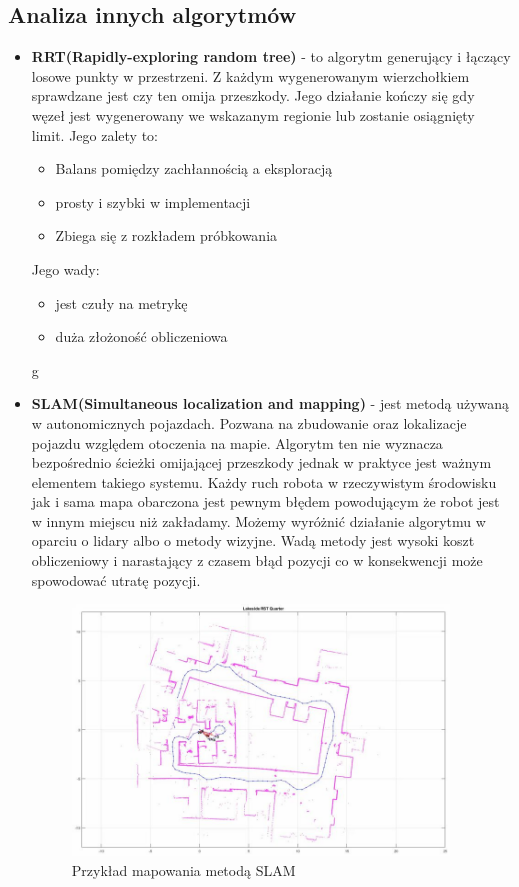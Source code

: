 \subsection{Analiza innych algorytmów}
\begin{itemize}
	\item{ \textbf{RRT(Rapidly-exploring random tree)}\cite{RRTLec} - to algorytm generujący i łączący 
	losowe punkty w przestrzeni. Z każdym wygenerowanym wierzchołkiem sprawdzane jest czy ten omija przeszkody.
	Jego działanie kończy się gdy węzeł jest wygenerowany we wskazanym regionie lub zostanie osiągnięty limit.
	Jego zalety to:
		\begin{itemize}
			\item Balans pomiędzy zachłannością a eksploracją
			\item prosty i szybki w implementacji
			\item Zbiega się z rozkładem próbkowania
		\end{itemize}
	Jego wady:
		\begin{itemize}
			\item jest czuły na metrykę
			\item duża złożoność obliczeniowa
		\end{itemize}
	}g
	\item{\textbf{SLAM(Simultaneous localization and mapping)} \cite{SLAMMat} - jest metodą używaną w autonomicznych 
	pojazdach. Pozwana na zbudowanie oraz lokalizacje pojazdu względem otoczenia na mapie. Algorytm ten nie wyznacza bezpośrednio
	ścieżki omijającej przeszkody jednak w praktyce jest ważnym elementem takiego systemu. Każdy ruch robota w rzeczywistym 
	środowisku jak i sama mapa obarczona jest pewnym błędem powodującym że robot jest w innym miejscu niż zakładamy. 
	Możemy wyróżnić działanie algorytmu w oparciu o lidary albo o metody wizyjne. Wadą metody jest wysoki koszt obliczeniowy 
	i narastający z czasem błąd pozycji co w konsekwencji może spowodować utratę pozycji.
	\begin{figure}[H]
		\centering
		\includegraphics[width=10cm]{pages/algorytm/zdjecia/slam.jpg}
		\caption{Przykład mapowania metodą SLAM\cite{SLAMMat}}
	\end{figure}
	}
\end{itemize}
